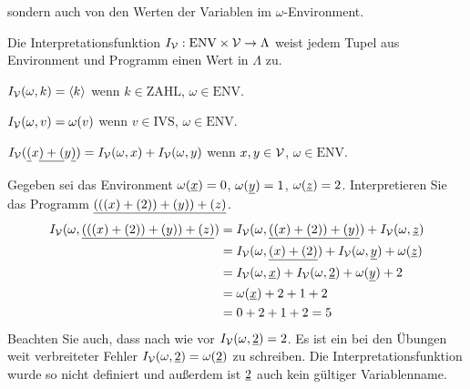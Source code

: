 sondern auch von den Werten der Variablen im $\omega$-Environment.
\begin{defn}
Die Interpretationsfunktion $I_{\mathcal{V}}: \text{ENV}\times\mathcal{V} \to \Lambda$
weist jedem Tupel aus Environment und Programm einen Wert in $\Lambda$ zu.
\begin{\whichenum}
\item $I_{\mathcal{V}}(\omega,k) = \left<k\right>$ wenn $k \in \text{ZAHL}$, $\omega \in \text{ENV}$.
\item $I_{\mathcal{V}}(\omega,v) = \omega(v)$ wenn $v \in \text{IVS}$, $\omega \in \text{ENV}$.
\item $I_{\mathcal{V}}(\underline{(}x\underline{)+(}y\underline{)})=I_{\mathcal{V}}(\omega,x) + I_{\mathcal{V}}(\omega,y)$ wenn $x,y \in \mathcal{V}$, $\omega \in \text{ENV}$.
\end{\whichenum}
\end{defn}
\begin{bsp}
Gegeben sei das Environment $\omega(\underline{x})=0$, $\omega(\underline{y})=1$, $\omega(\underline{z})=2$.
Interpretieren Sie das Programm $\underline{(((x)+(2))+(y))+(z)}$.
\begin{align*}
I_{\mathcal{V}}(\omega,\underline{(((x)+(2))+(y))+(z)}) &= I_{\mathcal{V}}(\omega,\underline{((x)+(2))+(y)}) + I_{\mathcal{V}}(\omega,\underline{z}) \\
&= I_{\mathcal{V}}(\omega,\underline{(x)+(2)}) + I_{\mathcal{V}}(\omega,\underline{y}) + \omega(\underline{z}) \\
&= I_{\mathcal{V}}(\omega,\underline{x}) + I_{\mathcal{V}}(\omega,\underline{2}) + \omega(\underline{y}) + 2 \\
&= \omega(\underline{x}) + 2 + 1 + 2 \\
&= 0 + 2 + 1 + 2 = 5
\end{align*}
Beachten Sie auch, dass nach wie vor $I_{\mathcal{V}}(\omega,\underline{2})=2$.
Es ist ein bei den Übungen weit verbreiteter Fehler $I_{\mathcal{V}}(\omega,\underline{2}) = \omega(\underline{2})$ zu schreiben. Die Interpretationsfunktion wurde so nicht definiert und
außerdem ist $\underline{2}$ auch kein gültiger Variablenname.
\end{bsp}

